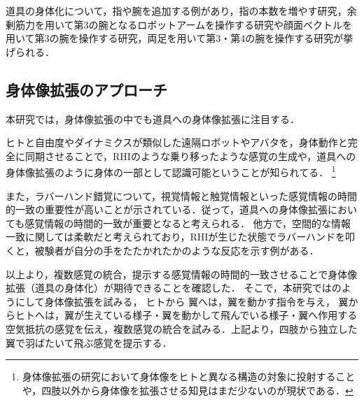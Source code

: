 \begin{small}
    道具の身体化について，指や腕を追加する例があり，指の本数を増やす研究\cite{prattichizzo2014sixth}，余剰筋力を用いて第3の腕となるロボットアームを操作する研究\cite{iwadare2017thirdarm}\cite{岩垂真哉2016余剰筋力を用いた第三の腕ロボットの操縦}や顔面ベクトルを用いて第3の腕を操作する研究\cite{iwasaki2017research}，両足を用いて第3・第4の腕を操作する研究が挙げられる\cite{sasaki2017metalimbs}．


  \subsection{身体像拡張のアプローチ} 
    本研究では，身体像拡張の中でも道具への身体像拡張に注目する．

    ヒトと自由度やダイナミクスが類似した遠隔ロボットやアバタを，身体動作と完全に同期させることで，RHIのような乗り移ったような感覚の生成や，道具への身体像拡張のように身体の一部として認識可能ということが知られてる．
    \footnote{身体像拡張の研究において身体像をヒトと異なる構造の対象に投射することや，四肢以外から身体像を拡張させる知見はまだ少ないのが現状である．}

    また，ラバーハンド錯覚について，視覚情報と触覚情報といった感覚情報の時間的一致の重要性が高いことが示されている\cite{本間元康2010ラバーハンドイリュージョン}\cite{ehrsson2007experimental}\cite{shimada2009rubber}．従って，道具への身体像拡張においても感覚情報の時間的一致が重要となると考えられる．
    他方で，空間的な情報一致に関しては柔軟だと考えられており，RHIが生じた状態でラバーハンドを叩くと，被験者が自分の手をたたかれたかのような反応を示す例がある\cite{armel2003projecting}．


    以上より，複数感覚の統合，提示する感覚情報の時間的一致させることで身体像拡張（道具の身体化）が期待できることを確認した．
    そこで，本研究ではのようにして身体像拡張を試みる，
    ヒトから
    翼へは，翼を動かす指令を与え，
    翼からヒトへは，翼が生えている様子・翼を動かして飛んでいる様子・翼へ作用する空気抵抗の感覚を伝え，複数感覚の統合を試みる．上記より，四肢から独立した翼で羽ばたいて飛ぶ感覚を提示する．







{


}

\end{small}


